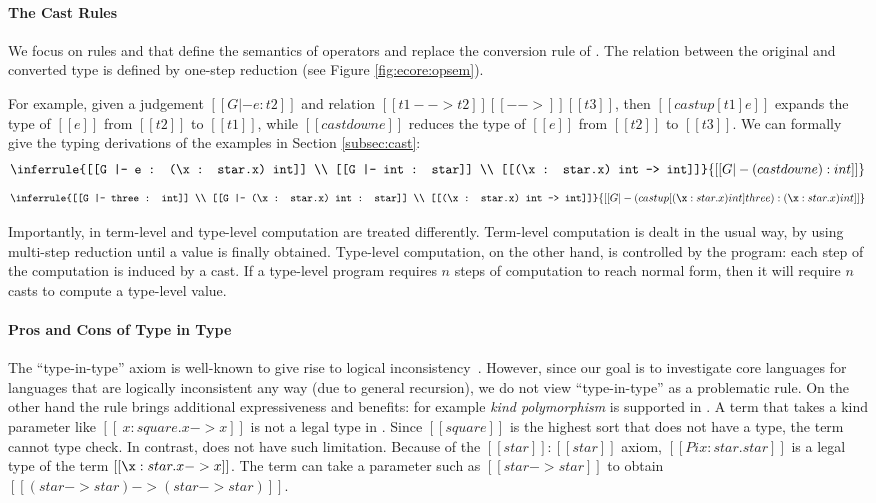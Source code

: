 \paragraph{The Cast Rules}
We focus on rules  and  that
define the semantics of \cast operators and replace the conversion
rule of \cc. The relation between the original
and converted type is defined by one-step reduction (see Figure
\ref{fig:ecore:opsem}). 

For example, given a judgement
$[[G |- e : t2]]$ and relation $[[t1 --> t2]] [[-->]] [[t3]]$, then
$[[castup [t1] e]]$ expands the type of $[[e]]$ from $[[t2]]$ to
$[[t1]]$, while $[[castdown e]]$ reduces the type of $[[e]]$ from
$[[t2]]$ to $[[t3]]$. We can formally give the typing derivations of 
the examples in Section \ref{subsec:cast}:
\[
\inferrule{[[G |- e : (\x : star.x) int]] \\ [[G |- int : star]] \\ [[(\x :
star.x) int --> int]]}{[[G |- (castdown e):int]]}
\]
\[
\inferrule{[[G |- three : int]] \\ [[G |- (\x : star.x) int : star]] \\ [[(\x :
star.x) int --> int]]}{[[G |- (castup[(\x : star.x) int] three):(\x : star.x)
int]]}
\]

Importantly, in \ecore term-level and type-level computation are treated 
differently. Term-level computation is dealt in the usual way, by 
using multi-step reduction until a value is finally obtained. 
Type-level computation, on the other hand, is controlled by the program:
each step of the computation is induced by a cast. If a type-level 
program requires $n$ steps of computation to reach normal form, 
then it will require $n$ casts to compute a type-level value.

\paragraph{Pros and Cons of Type in Type}
The ``type-in-type'' axiom is well-known to give rise 
to logical inconsistency~\cite{systemfw}. However, since our goal is to 
investigate core languages for languages that are logically
inconsistent any way (due to general recursion), we do not view 
``type-in-type''  as a problematic rule.
On the other hand the rule  brings additional
expressiveness and benefits:
for example \emph{kind polymorphism} is supported in \ecore.
A term that takes a kind parameter like $[[\
    x:square.x->x]]$ is not a legal type in \cc. Since $[[square]]$ is
the highest sort that does not have a type, the term cannot type check.
In contrast, \ecore does not have such limitation. Because of
the $[[star]]:[[star]]$ axiom, $[[Pi x:star.star]]$ is 
a legal type of the term $[[\x:star.x->x]]$. The term can take 
a parameter such as $[[star -> star]]$
to obtain $[[(star->star) -> (star -> star)]]$.


